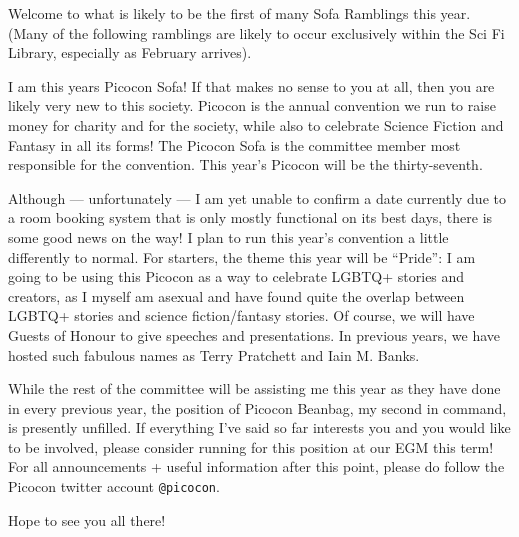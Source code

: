 Welcome to what is likely to be the first of many Sofa Ramblings
\texttrademark{} this year. (Many of the following ramblings are
likely to occur exclusively within the Sci Fi Library, especially as
February arrives).

I am this years Picocon Sofa! If that makes no sense to you at all,
then you are likely very new to this society. Picocon is the annual
convention we run to raise money for charity and for the society,
while also to celebrate Science Fiction and Fantasy in all its forms!
The Picocon Sofa is the committee member most responsible for the
convention. This year’s Picocon will be the thirty-seventh.

Although --- unfortunately --- I am yet unable to confirm a date
currently due to a room booking system that is only mostly functional
on its best days, there is some good news on the way! I plan to run
this year’s convention a little differently to normal. For starters,
the theme this year will be “Pride”: I am going to be using this
Picocon as a way to celebrate LGBTQ+ stories and creators, as I myself
am asexual and have found quite the overlap between LGBTQ+ stories and
science fiction/fantasy stories. Of course, we will have Guests of
Honour to give speeches and presentations. In previous years, we have
hosted such fabulous names as Terry Pratchett and Iain M. Banks.

While the rest of the committee will be assisting me this year as they
have done in every previous year, the position of Picocon Beanbag, my
second in command, is presently unfilled. If everything I’ve said so
far interests you and you would like to be involved, please consider
running for this position at our EGM this term! For all announcements
+ useful information after this point, please do follow the Picocon
twitter account \texttt{@picocon}.

Hope to see you all there!
